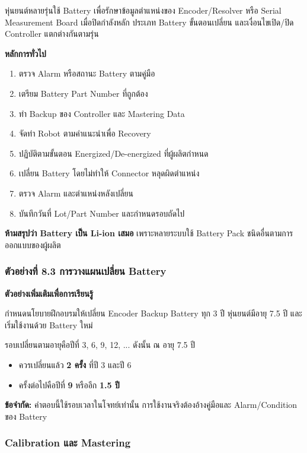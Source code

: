 หุ่นยนต์หลายรุ่นใช้ Battery เพื่อรักษาข้อมูลตำแหน่งของ Encoder/Resolver หรือ Serial Measurement Board เมื่อปิดกำลังหลัก ประเภท Battery ขั้นตอนเปลี่ยน และเงื่อนไขเปิด/ปิด Controller แตกต่างกันตามรุ่น

\textbf{หลักการทั่วไป}

\begin{enumerate}
    \item ตรวจ Alarm หรือสถานะ Battery ตามคู่มือ
    \item เตรียม Battery Part Number ที่ถูกต้อง
    \item ทำ Backup ของ Controller และ Mastering Data
    \item จัดท่า Robot ตามคำแนะนำเพื่อ Recovery
    \item ปฏิบัติตามขั้นตอน Energized/De-energized ที่ผู้ผลิตกำหนด
    \item เปลี่ยน Battery โดยไม่ทำให้ Connector หลุดผิดตำแหน่ง
    \item ตรวจ Alarm และตำแหน่งหลังเปลี่ยน
    \item บันทึกวันที่ Lot/Part Number และกำหนดรอบถัดไป
\end{enumerate}

\textbf{ห้ามสรุปว่า Battery เป็น Li-ion เสมอ} เพราะหลายระบบใช้ Battery Pack ชนิดอื่นตามการออกแบบของผู้ผลิต

\subsubsection{ตัวอย่างที่ 8.3 การวางแผนเปลี่ยน Battery}

\textbf{ตัวอย่างเพิ่มเติมเพื่อการเรียนรู้}

กำหนดนโยบายฝึกอบรมให้เปลี่ยน Encoder Backup Battery ทุก 3 ปี หุ่นยนต์มีอายุ 7.5 ปี และเริ่มใช้งานด้วย Battery ใหม่

รอบเปลี่ยนตามอายุคือปีที่ 3, 6, 9, 12, ... ดังนั้น ณ อายุ 7.5 ปี

\begin{itemize}
    \item ควรเปลี่ยนแล้ว \textbf{2 ครั้ง} ที่ปี 3 และปี 6
    \item ครั้งต่อไปคือปีที่ \textbf{9} หรืออีก \textbf{1.5 ปี}
\end{itemize}

\textbf{ข้อจำกัด:} คำตอบนี้ใช้รอบเวลาในโจทย์เท่านั้น การใช้งานจริงต้องอ้างคู่มือและ Alarm/Condition ของ Battery

\subsubsection{Calibration และ Mastering}

